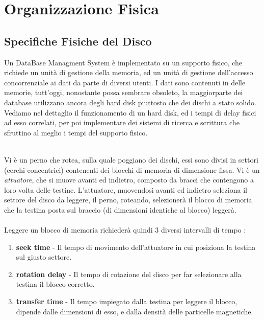 \documentclass[12pt, letterpaper]{article}
\newcommand{\acc}{\\\hphantom{}\\}
\begin{document}
\section{Organizzazione Fisica}\label{orgFisica}
\subsection{Specifiche Fisiche del Disco}
Un DataBase Managment System è implementato su un supporto fisico, che richiede un unità di gestione della memoria, ed un 
unità di gestione dell'accesso concorrenziale ai dati da parte di diversi utenti. I dati sono contenuti in delle memorie, 
tutt'oggi, nonostante possa sembrare obsoleto, la maggiorparte dei database utilizzano ancora degli hard disk piuttosto che 
dei dischi a stato solido. Vediamo nel dettaglio il funzionamento di un hard disk, ed i tempi di delay fisici ad esso correlati, 
per poi implementare dei sistemi di ricerca e scrittura che sfruttino al meglio i tempi del supporto fisico.
\begin{figure}[h]
\end{figure}\\
Vi è un perno che rotea, sulla quale poggiano dei dischi, essi sono divisi in settori (cerchi 
concentrici) contenenti dei blocchi di memoria di dimensione fissa. Vi è un \textit{attuatore}, che si muove avanti ed indietro, 
composto da bracci che contengono a loro volta delle testine. L'attuatore, muovendosi avanti ed indietro seleziona il settore del 
disco da leggere, il perno, roteando, selezionerà il blocco di memoria che la testina posta sul braccio (di dimensioni 
identiche al blocco) leggerà.\acc 
Leggere un blocco di memoria richiederà quindi 3 diversi intervalli di tempo :\begin{enumerate}
    \item \textbf{seek time }- Il tempo di movimento dell'attuatore in cui posiziona la testina sul giusto settore.
    \item \textbf{rotation delay} - Il tempo di rotazione del disco per far selezionare alla testina il blocco corretto.
    \item \textbf{transfer time} - Il tempo impiegato dalla testina per leggere il blocco, dipende dalle dimensioni di esso, 
    e dalla densità delle particelle magnetiche.
\end{enumerate}
\end{document}
